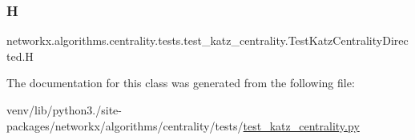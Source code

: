 \subsubsection{\texorpdfstring{H}{H}}
{\footnotesize\ttfamily networkx.\+algorithms.\+centrality.\+tests.\+test\+\_\+katz\+\_\+centrality.\+Test\+Katz\+Centrality\+Directed.\+H}



The documentation for this class was generated from the following file\+:\begin{DoxyCompactItemize}
\item 
venv/lib/python3./site-\/packages/networkx/algorithms/centrality/tests/\hyperlink{test__katz__centrality_8py}{test\+\_\+katz\+\_\+centrality.\+py}\end{DoxyCompactItemize}
